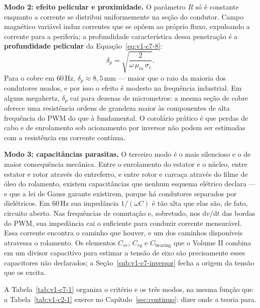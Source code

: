 \documentclass[12pt,a4paper]{article}
\numberwithin{equation}{section}
\numberwithin{table}{section}
\numberwithin{figure}{section}
\begin{document}
\textbf{Modo 2: efeito pelicular e proximidade.} O parâmetro $R$ só é constante
enquanto a corrente se distribui uniformemente na seção do condutor. Campo
magnético variável induz correntes que se opõem ao próprio fluxo, expulsando a
corrente para a periferia; a profundidade característica dessa penetração é a
\textbf{profundidade pelicular} da Equação~\eqref{eq:v1-c7-8}:
\begin{equation}\label{eq:v1-c7-8}
\delta_p = \sqrt{\frac{2}{\omega\,\mu_m\,\sigma_e}} .
\end{equation}
Para o cobre em $60\,$Hz, $\delta_p \approx 8{,}5\,$mm --- maior que o raio da
maioria dos condutores usados, e por isso o efeito é modesto na frequência
industrial. Em alguns megahertz, $\delta_p$ cai para dezenas de micrometros: a
mesma seção de cobre oferece uma resistência ordens de grandeza maior às
componentes de alta frequência do PWM do que à fundamental. O corolário
prático é que perdas de cabo e de enrolamento sob acionamento por inversor não
podem ser estimadas com a resistência em corrente contínua.

\textbf{Modo 3: capacitâncias parasitas.} O terceiro modo é o mais silencioso e
o de maior consequência mecânica. Entre o enrolamento do estator e o núcleo,
entre estator e rotor através do entreferro, e entre rotor e carcaça através do
filme de óleo do rolamento, existem capacitâncias que nenhum esquema elétrico
declara --- e que a lei de Gauss garante existirem, porque há condutores
separados por dielétricos. Em $60\,$Hz sua impedância $1/(\omega C)$ é tão alta
que elas são, de fato, circuito aberto. Nas frequências de comutação e,
sobretudo, nos $\mathrm{d}v/\mathrm{d}t$ das bordas do PWM, sua impedância cai
o suficiente para conduzir corrente mensurável. Essa corrente encontra o
caminho que houver, e um dos caminhos disponíveis atravessa o rolamento. Os
elementos $C_{sr}$, $C_{rg}$ e $C_{\text{bearing}}$ que o Volume II combina em
um divisor capacitivo para estimar a tensão de eixo são precisamente esses
capacitores não declarados; a Seção~\ref{sub:v1-c7-inversor} fecha a origem da
tensão que os excita.

A Tabela~\ref{tab:v1-c7-1} organiza o critério e os três modos, na mesma
função que a Tabela~\ref{tab:v1-c2-1} exerce no Capítulo~\ref{sec:continuo}:
dizer onde a teoria para.
\end{document}
